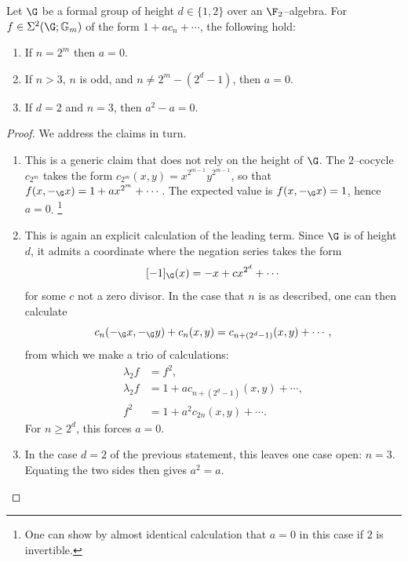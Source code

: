 \begin{lemma}\label{SigmaNonexistenceLemma}
Let \(\G\) be a formal group of height \(d \in \{1, 2\}\) over an \(\F_2\)--algebra.
For \(f \in \Sigma^2(\G; \Gm)\) of the form \(1 + a c_n + \cdots\), the following hold:
\begin{enumerate}
    \item If \(n = 2^m\) then \(a = 0\).
    \item If \(n > 3\), \(n\) is odd, and \(n \ne 2^m - (2^d - 1)\), then \(a = 0\).
    \item If \(d = 2\) and \(n = 3\), then \(a^2 - a = 0\).
\end{enumerate}
\end{lemma}
\begin{proof}
We address the claims in turn.
\begin{enumerate}
    \item This is a generic claim that does not rely on the height of \(\G\).
          The \(2\)--cocycle \(c_{2^m}\) takes the form \(c_{2^m}(x, y) = x^{2^{m-1}} y^{2^{m-1}}\), so that \(f(x, -_{\G} x) = 1 + a x^{2^m} + \cdots\).
          The expected value is \(f(x, -_{\G} x) = 1\), hence \(a = 0\).%
\footnote{%
          One can show by almost identical calculation that \(a = 0\) in this case if \(2\) is invertible.
}
    \item This is again an explicit calculation of the leading term.
          Since \(\G\) is of height \(d\), it admits a coordinate where the negation series takes the form \[[-1]_{\G}(x) = -x + cx^{2^d} + \cdots\] for some \(c\) not a zero divisor.
          In the case that \(n\) is as described, one can then calculate \[c_n(-_{\G} x, -_{\G} y) + c_n(x, y) = c_{n + (2^d-1)}(x, y) + \cdots,\] from which we make a trio of calculations:
          \begin{align*}
          \lambda_2 f & = f^2, \tag{uses \(f \in \Sigma^2(\G; \Gm)\)} \\
          \lambda_2 f & = 1 + ac_{n + (2^d-1)}(x, y) + \cdots, \tag{above observation} \\
          f^2 & = 1 + a^2 c_{2n}(x, y) + \cdots. \tag{characteristic \(2\)}
          \end{align*}
          For \(n \ge 2^d\), this forces \(a = 0\).
    \item In the case \(d = 2\) of the previous statement, this leaves one case open: \(n = 3\).
          Equating the two sides then gives \(a^2 = a\).
    \qedhere
\end{enumerate}
\end{proof}

